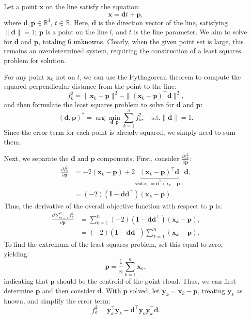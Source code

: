 Let a point $\bm{x}$ on the line satisfy the equation:
\begin{equation}\label{key}
	\bm{x} = \bm{d} t + \bm{p},
\end{equation}
where $\bm{d}, \bm{p} \in \mathbb{R}^3$, $t \in \mathbb{R}$. Here, $\bm{d}$ is the direction vector of the line, satisfying $\|\bm{d}\| = 1$; $\bm{p}$ is a point on the line $l$, and $t$ is the line parameter. We aim to solve for $\bm{d}$ and $\bm{p}$, totaling 6 unknowns. Clearly, when the given point set is large, this remains an overdetermined system, requiring the construction of a least squares problem for solution.

For any point $\bm{x}_k$ not on $l$, we can use the Pythagorean theorem to compute the squared perpendicular distance from the point to the line:
\begin{equation}\label{key}
	f^2_k = \| \bm{x}_k - \bm{p}\|^2 - \| (\bm{x}_k-\bm{p})^\top \bm{d} \|^2 ,
\end{equation}
and then formulate the least squares problem to solve for $\bm{d}$ and $\bm{p}$:
\begin{equation}\label{key}
	(\bm{d},\bm{p})^* = \arg \min_{\bm{d}, \bm{p}} \sum_{k=1}^{n} f_k^2, \quad \text{s.t.} \|\bm{d}\|= 1.
\end{equation}
Since the error term for each point is already squared, we simply need to sum them.

Next, we separate the $\bm{d}$ and $\bm{p}$ components. First, consider $\frac{\partial f^2_k}{\partial \bm{p}}$:
\begin{align}\label{key}
	\frac{\partial f^2_k}{\partial \bm{p}} &= -2(\bm{x}_k - \bm{p}) + 2 \underbrace{(\bm{x}_k - \bm{p})^\top \bm{d}}_{\text{scalar, }=\bm{d}^\top (\bm{x}_k - \bm{p})} \bm{d}, \\
	&= (-2) (\bm{I} - \bm{d} \bm{d}^\top) (\bm{x}_k - \bm{p}).
\end{align}
Thus, the derivative of the overall objective function with respect to $\bm{p}$ is:
\begin{align}\label{key}
	\frac{\partial \sum_{k=1}^{n} f_k^2}{\partial \bm{p}} &= \sum_{k=1}^{n} (-2) (\bm{I} - \bm{d} \bm{d}^\top) (\bm{x}_k - \bm{p}), \\ 
	&= (-2) (\bm{I} - \bm{d} \bm{d}^\top) \sum_{k=1}^n (\bm{x}_k - \bm{p}).
\end{align}
To find the extremum of the least squares problem, set this equal to zero, yielding:
\begin{equation}
	\bm{p} = \frac{1}{n} \sum_{k=1}^n \bm{x}_k,
\end{equation}
indicating that $\bm{p}$ should be the centroid of the point cloud. Thus, we can first determine $\bm{p}$ and then consider $\bm{d}$. With $\bm{p}$ solved, let $\bm{y}_k = \bm{x}_k - \bm{p}$, treating $\bm{y}_k$ as known, and simplify the error term:
\begin{equation}\label{eq.6.24}
	f_k^2 = \bm{y}_k^\top \bm{y}_k - \bm{d}^\top \bm{y}_k \bm{y}_k^\top \bm{d}.
\end{equation}

